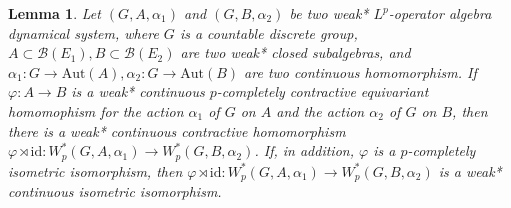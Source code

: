 \documentclass[reqno,11pt]{amsart}
\theoremstyle{plain}
\newtheorem{lem}[thm]{Lemma}
\theoremstyle{definition}
\theoremstyle{remark}
\begin{document}
\begin{lem}\label{induce}
Let $(G,A,\alpha_1)$ and $(G,B,\alpha_2)$ be two weak* $L^p$-operator algebra dynamical system, where $G$ is a countable discrete group, $A\subset\mathcal{B}(E_1),B\subset\mathcal{B}(E_2)$ are two weak* closed subalgebras, and $\alpha_1:G\rightarrow \mathrm{Aut}(A), \alpha_2:G\rightarrow \mathrm{Aut}(B)$ are two continuous homomorphism. If $\varphi:A\rightarrow B$ is a weak* continuous $p$-completely contractive equivariant homomophism for the action $\alpha_1$ of $G$ on $A$ and the action $\alpha_2$ of $G$ on $B$, then there is a weak* continuous contractive homomorphism $\varphi\rtimes\mathrm{id}:W^*_p(G,A,\alpha_1)\rightarrow W^*_p(G,B,\alpha_2)$. If, in addition, $\varphi$ is a $p$-completely isometric isomorphism, then $\varphi\rtimes\mathrm{id}:W^*_p(G,A,\alpha_1)\rightarrow W^*_p(G,B,\alpha_2)$ is a weak* continuous isometric isomorphism.
\end{lem}
\end{document}
